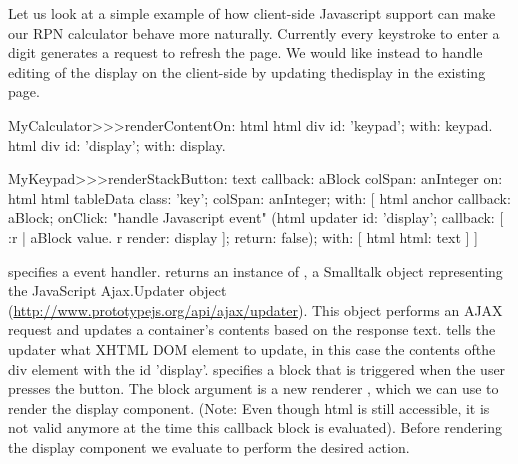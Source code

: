 \documentclass[a4paper,10pt,twoside]{book}
\begin{document}
Let us look at a simple example of how client-side Javascript support can make our RPN
calculator behave more naturally.
Currently every keystroke to enter a digit generates a request to refresh the page.
We would like instead to handle editing of the display on the client-side by updating thedisplay in the existing page.


\begin{code}{}
MyCalculator>>>renderContentOn: html
	html div id: 'keypad'; with: keypad.
	html div id: 'display'; with: display.	
\end{code}
				

\begin{code}{}
MyKeypad>>>renderStackButton: text callback: aBlock colSpan: anInteger on: html 
	html tableData
		class: 'key';
		colSpan: anInteger;
		with: [
			html anchor
				callback: aBlock;
				onClick:				"handle Javascript event"
					(html updater
						id: 'display';
						callback: [ :r |
							aBlock value.
							r render: display ];
						return: false);
				with: [ html html: text ] ]
\end{code}

 specifies a  event handler.
 returns an instance of , a Smalltalk object representing
the JavaScript Ajax.Updater object (\url{http://www.prototypejs.org/api/ajax/updater}).
This object performs an AJAX request and updates a container's contents based on the
response text.
 tells the updater what XHTML DOM element to update, in this case the contents ofthe div element with the id 'display'.
 specifies a block that is triggered when the user presses the button.
The block argument is a new renderer , which we can use to render the display
component.
(Note: Even though html is still accessible, it is not valid anymore at the time this
callback block is evaluated).
Before rendering the display component we evaluate  to perform the desired
action.
\end{document}

